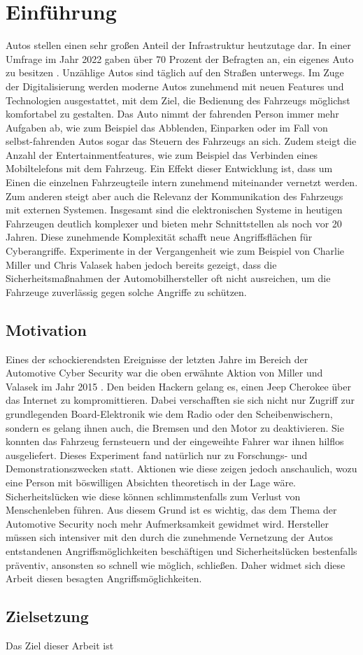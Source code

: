 \chapter{Einführung}

Autos stellen einen sehr großen Anteil der Infrastruktur heutzutage dar. In einer Umfrage im Jahr 2022 gaben über 70 Prozent der Befragten an, ein eigenes Auto zu besitzen \cite[vgl.][]{Statista.2022}. Unzählige Autos sind täglich auf den Straßen unterwegs. Im Zuge der Digitalisierung werden moderne Autos zunehmend mit neuen Features und Technologien ausgestattet, mit dem Ziel, die Bedienung des Fahrzeugs möglichst komfortabel zu gestalten. Das Auto nimmt der fahrenden Person immer mehr Aufgaben ab, wie zum Beispiel das Abblenden, Einparken oder im Fall von selbst-fahrenden Autos sogar das Steuern des Fahrzeugs an sich. Zudem steigt die Anzahl der Entertainmentfeatures, wie zum Beispiel das Verbinden eines Mobiltelefons mit dem Fahrzeug. Ein Effekt dieser Entwicklung ist, dass um Einen die einzelnen Fahrzeugteile intern zunehmend miteinander vernetzt werden. Zum anderen steigt aber auch die Relevanz der Kommunikation des Fahrzeugs mit externen Systemen. Insgesamt sind die elektronischen Systeme in heutigen Fahrzeugen deutlich komplexer und bieten mehr Schnittstellen als noch vor 20 Jahren. Diese zunehmende Komplexität schafft neue Angriffsflächen für Cyberangriffe. Experimente in der Vergangenheit wie zum Beispiel von Charlie Miller und Chris Valasek \cite[vgl.][]{Greenberg.2015} haben jedoch bereits gezeigt, dass die Sicherheitsmaßnahmen der Automobilhersteller oft nicht ausreichen, um die Fahrzeuge zuverlässig gegen solche Angriffe zu schützen.

\section{Motivation}
Eines der schockierendsten Ereignisse der letzten Jahre im Bereich der Automotive Cyber Security war die oben erwähnte Aktion von Miller und Valasek im Jahr 2015 \cite[vgl.][]{Greenberg.2015}. Den beiden Hackern gelang es, einen Jeep Cherokee über das Internet zu kompromittieren. Dabei verschafften sie sich nicht nur Zugriff zur grundlegenden Board-Elektronik wie dem Radio oder den Scheibenwischern, sondern es gelang ihnen auch, die Bremsen und den Motor zu deaktivieren. Sie konnten das Fahrzeug fernsteuern und der eingeweihte Fahrer war ihnen hilflos ausgeliefert. Dieses Experiment fand natürlich nur zu Forschungs- und Demonstrationszwecken statt. Aktionen wie diese zeigen jedoch anschaulich, wozu eine Person mit böswilligen Absichten theoretisch in der Lage wäre. Sicherheitslücken wie diese können schlimmstenfalls zum Verlust von Menschenleben führen. Aus diesem Grund ist es wichtig, das dem Thema der Automotive Security noch mehr Aufmerksamkeit gewidmet wird. Hersteller müssen sich intensiver mit den durch die zunehmende Vernetzung der Autos entstandenen Angriffsmöglichkeiten beschäftigen und Sicherheitslücken bestenfalls präventiv, ansonsten so schnell wie möglich, schließen. Daher widmet sich diese Arbeit diesen besagten Angriffsmöglichkeiten.

\section{Zielsetzung}
Das Ziel dieser Arbeit ist